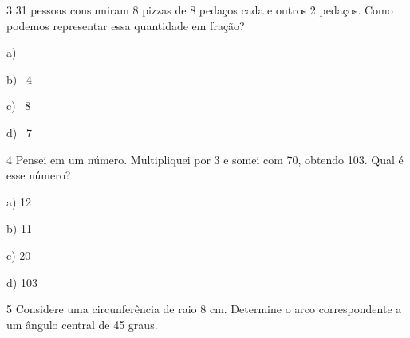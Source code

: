 \num{3} 31 pessoas consumiram 8 pizzas de 8 pedaços cada e outros 2 pedaços.
Como podemos representar essa quantidade em fração?

a) 

b) \ 4

c) \ 8

d) \ 7




\num{4} Pensei em um número. Multipliquei por 3 e somei com 70, obtendo 103.
Qual é esse número?

a) 12

b) 11

c) 20

d) 103



\num{5} Considere uma circunferência de raio 8 cm. Determine o arco
correspondente a um ângulo central de 45 graus.

